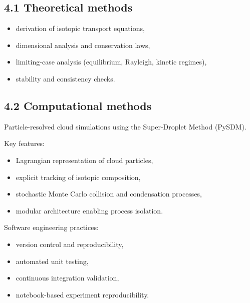 \documentclass[11pt,a4paper]{article}
\begin{document}
\subsection*{4.1 Theoretical methods}
\begin{itemize}
\item derivation of isotopic transport equations,


\item dimensional analysis and conservation laws,


\item limiting-case analysis (equilibrium, Rayleigh, kinetic regimes),


\item stability and consistency checks.


\end{itemize}
\subsection*{4.2 Computational methods}
Particle-resolved cloud simulations using the Super-Droplet Method (PySDM).

Key features:

\begin{itemize}
\item Lagrangian representation of cloud particles,


\item explicit tracking of isotopic composition,


\item stochastic Monte Carlo collision and condensation processes,


\item modular architecture enabling process isolation.


\end{itemize}
Software engineering practices:

\begin{itemize}
\item version control and reproducibility,


\item automated unit testing,


\item continuous integration validation,


\item notebook-based experiment reproducibility.


\end{itemize}
\end{document}
